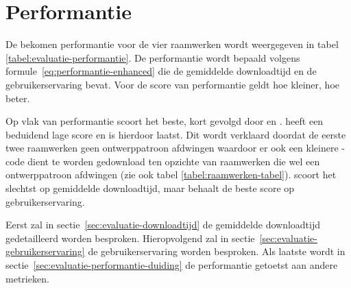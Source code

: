 \section{Performantie}
\label{sec:evaluatie-performantie}

De bekomen performantie voor de vier raamwerken wordt weergegeven in tabel \ref{tabel:evaluatie-performantie}.
De performantie wordt bepaald volgens formule~\ref{eq:performantie-enhanced} die de gemiddelde downloadtijd en de gebruikerservaring bevat.
Voor de score van performantie geldt hoe kleiner, hoe beter.

\begin{table}
\centering
{}
\caption{Overzicht van performantie.}
\label{tabel:evaluatie-performantie}
\end{table}

Op vlak van performantie scoort \lungo{} het beste, kort gevolgd door \jqm{} en \st{}.
\kendo{} heeft een beduidend lage score en is hierdoor laatst.
Dit wordt verklaard doordat de eerste twee raamwerken geen ontwerppatroon afdwingen waardoor er ook een kleinere \js{}-code dient te worden gedownload ten opzichte van raamwerken die wel een ontwerppatroon afdwingen (zie ook tabel \ref{tabel:raamwerken-tabel}).
\st{} scoort het slechtst op gemiddelde downloadtijd, maar behaalt de beste score op gebruikerservaring.

Eerst zal in sectie~\ref{sec:evaluatie-downloadtijd} de gemiddelde downloadtijd gedetailleerd worden besproken.
Hieropvolgend zal in sectie~\ref{sec:evaluatie-gebruikerservaring} de gebruikerservaring worden besproken.
Als laatste wordt in sectie~\ref{sec:evaluatie-performantie-duiding} de performantie getoetst aan andere metrieken.


